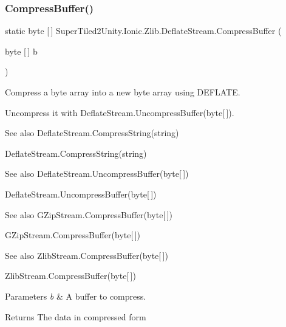 \subsubsection{\texorpdfstring{Compress\+Buffer()}{CompressBuffer()}}
{\footnotesize\ttfamily static byte \mbox{[}$\,$\mbox{]} Super\+Tiled2\+Unity.\+Ionic.\+Zlib.\+Deflate\+Stream.\+Compress\+Buffer (\begin{DoxyParamCaption}\item[{byte \mbox{[}$\,$\mbox{]}}]{b }\end{DoxyParamCaption})\hspace{0.3cm}{\ttfamily [static]}}



Compress a byte array into a new byte array using D\+E\+F\+L\+A\+TE. 

Uncompress it with Deflate\+Stream.\+Uncompress\+Buffer(byte\mbox{[}$\,$\mbox{]}). 

\begin{DoxySeeAlso}{See also}
Deflate\+Stream.\+Compress\+String(string)


\end{DoxySeeAlso}
Deflate\+Stream.\+Compress\+String(string)

\begin{DoxySeeAlso}{See also}
Deflate\+Stream.\+Uncompress\+Buffer(byte\mbox{[}$\,$\mbox{]})


\end{DoxySeeAlso}
Deflate\+Stream.\+Uncompress\+Buffer(byte\mbox{[}$\,$\mbox{]})

\begin{DoxySeeAlso}{See also}
G\+Zip\+Stream.\+Compress\+Buffer(byte\mbox{[}$\,$\mbox{]})


\end{DoxySeeAlso}
G\+Zip\+Stream.\+Compress\+Buffer(byte\mbox{[}$\,$\mbox{]})

\begin{DoxySeeAlso}{See also}
Zlib\+Stream.\+Compress\+Buffer(byte\mbox{[}$\,$\mbox{]})


\end{DoxySeeAlso}
Zlib\+Stream.\+Compress\+Buffer(byte\mbox{[}$\,$\mbox{]})


\begin{DoxyParams}{Parameters}
{\em b} & A buffer to compress. \\
\hline
\end{DoxyParams}


\begin{DoxyReturn}{Returns}
The data in compressed form
\end{DoxyReturn}
\mbox{\label{class_super_tiled2_unity_1_1_ionic_1_1_zlib_1_1_deflate_stream_a65c35073943a8f21f85c0afddf4f8874}} 
